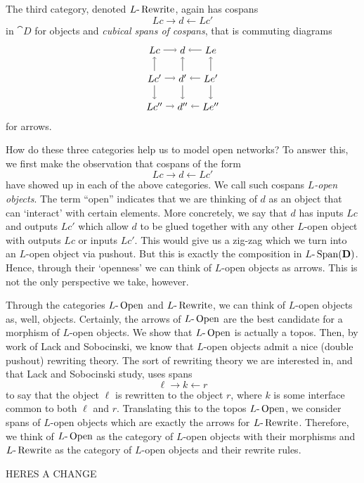 The third category, denoted
	$ L \text{-} \operatorname{Rewrite} $,
again has cospans 
\[
	Lc \to d \gets Lc'
\]
in $ \cat{D} $ for objects and
\emph{cubical spans of cospans}, that is
commuting diagrams 
\[ %
\begin{tikzpicture}
	\node (Lc) at (-1,1) {$ Lc $};
	\node (Lc') at (-1,0) {$ Lc' $};
	\node (Lc'') at (-1,-1) {$ Lc'' $};
	\node (d) at (0,1) {$ d $};
	\node (d') at (0,0) {$ d' $};
	\node (d'') at (0,-1) {$ d'' $};
	\node (Le) at (1,1) {$ Le $};
	\node (Le') at (1,0) {$ Le' $};
	\node (Le'') at (1,-1) {$ Le'' $};
	\draw [->] (Lc) to (d);
	\draw [->] (Le) to (d);
	\draw [->] (Lc') to (d');
	\draw [->] (Le') to (d');
	\draw [->] (Lc'') to (d'');
	\draw [->] (Le'') to (d'');
	\draw [->] (Lc') to (Lc);
	\draw [->] (Lc') to (Lc'');
	\draw [->] (d') to (d);
	\draw [->] (d') to (d'');
	\draw [->] (Le') to (Le);
	\draw [->] (Le') to (Le'');
\end{tikzpicture}
\]
for arrows.  

How do these three categories help
us to model open networks?
To answer this, we first make the
observation that cospans of the form
\[
	Lc \to d \gets Lc'
\]
have showed up in each of the above
categories. We call such cospans
\emph{$L$-open objects}.  The term ``open''
indicates that we are thinking of $d$ as 
an object that can `interact' with certain 
elements. More concretely, we say that $ d $ 
has inputs $Lc$ and outputs $ Lc' $ which allow
$ d $ to be glued together with any other
$ L $-open object with outputs $ Lc $ or 
inputs $ Lc' $.  This would give us a zig-zag
which we turn into an $ L $-open object
via pushout.  But this is exactly the composition
in $ L \text{-} \operatorname{Span} ( \mathbf{D} ) $. Hence, through their `openness' 
we can think of $ L $-open objects as arrows.
This is not the only perspective we take, however.

Through the categories $ L \text{-} \operatorname{Open} $ and $ L \text{-} \operatorname{Rewrite} $,
we can think of $ L $-open objects as, well, objects.
Certainly, the arrows of $ L \text{-} \operatorname{Open} $ are the best
candidate for a morphism of $ L $-open objects.  
We show that $ L \text{-} \operatorname{Open} $ is actually a topos.
Then, by work of Lack and Sobocinski, we know that
$ L $-open objects admit a nice (double pushout)
rewriting theory. The sort of rewriting theory we are
interested in, and that Lack and Sobocinski study,
uses spans 
\[
	\ell \to k \gets r
\]
to say that the object $ \ell $ is
rewritten to the object $ r $, where $ k $
is some interface common to both 
$ \ell $ and $ r $.  Translating this to the topos 
$ L \text{-} \operatorname{Open} $, we consider spans of $ L $-open objects
which are exactly the arrows for $ L \text{-} \operatorname{Rewrite} $.
Therefore, we think of $ L \text{-} \operatorname{Open} $ as the
category of $ L $-open objects with their
morphisms and $ L \text{-} \operatorname{Rewrite} $ as the category
of $ L $-open objects and their rewrite rules.  

HERES A CHANGE






